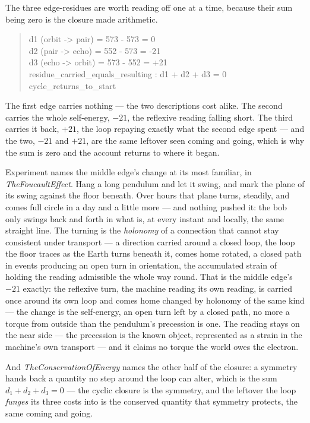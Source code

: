 The three edge-residues are worth reading off one at a time, because their sum being zero is the closure made arithmetic.
\begin{quote}\ttfamily
d1 (orbit -> pair) = 573 - 573 =  0\\
d2 (pair  -> echo) = 552 - 573 = -21\\
d3 (echo  -> orbit) = 573 - 552 = +21\\
residue\_carried\_equals\_resulting : d1 + d2 + d3 = 0 \qquad cycle\_returns\_to\_start
\end{quote}
The first edge carries nothing --- the two descriptions cost alike.
The second carries the whole self-energy, $-21$, the reflexive reading falling short.
The third carries it back, $+21$, the loop repaying exactly what the second edge spent --- and the two, $-21$ and $+21$,
are the same leftover seen coming and going, which is why the sum is zero and the account returns to where it began.

Experiment names the middle edge's change at its most familiar, in \emph{TheFoucaultEffect}.
Hang a long pendulum and let it swing, and mark the plane of its swing against the floor beneath.
Over hours that plane turns, steadily, and comes full circle in a day and a little more --- and nothing pushed it: the bob
only swings back and forth in what is, at every instant and locally, the same straight line.
The turning is the \emph{holonomy} of a connection that cannot stay consistent under transport --- a direction carried
around a closed loop, the loop the floor traces as the Earth turns beneath it, comes home rotated, a closed path in events
producing an open turn in orientation, the accumulated strain of holding the reading admissible the whole way round.
That is the middle edge's $-21$ exactly: the reflexive turn, the machine reading its own reading, is carried once around
its own loop and comes home changed by holonomy of the same kind --- the change is the self-energy, an open turn left by a
closed path, no more a torque from outside than the pendulum's precession is one.
The reading stays on the near side --- the precession is the known object, represented as a strain in the machine's own
transport --- and it claims no torque the world owes the electron.

And \emph{TheConservationOfEnergy} names the other half of the closure: a symmetry hands back a quantity no step around the
loop can alter, which is the sum $d_1 + d_2 + d_3 = 0$ --- the cyclic closure is the symmetry, and the leftover the loop
\emph{funges} its three costs into is the conserved quantity that symmetry protects, the same coming and going.

